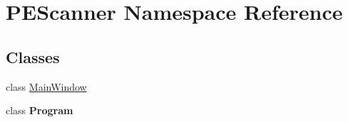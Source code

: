 \hypertarget{namespace_p_e_scanner}{}\section{P\+E\+Scanner Namespace Reference}
\label{namespace_p_e_scanner}
\subsection*{Classes}
\begin{DoxyCompactItemize}
\item 
class \mbox{\hyperlink{class_p_e_scanner_1_1_main_window}{Main\+Window}}
\item 
class {\bfseries Program}
\end{DoxyCompactItemize}
